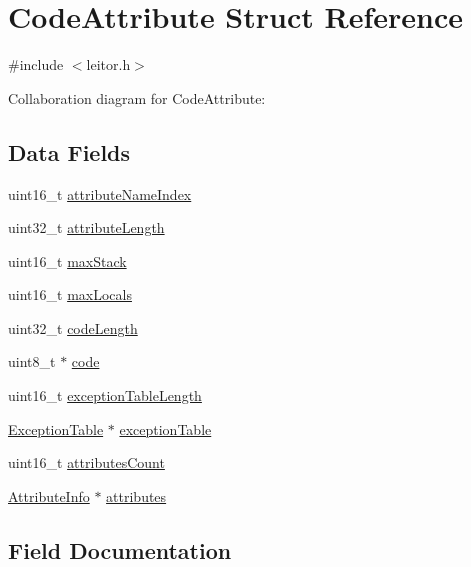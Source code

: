 \hypertarget{structCodeAttribute}{}\section{Code\+Attribute Struct Reference}
\label{structCodeAttribute}


{\ttfamily \#include $<$leitor.\+h$>$}



Collaboration diagram for Code\+Attribute\+:
\subsection*{Data Fields}
\begin{DoxyCompactItemize}
\item 
uint16\+\_\+t \hyperlink{structCodeAttribute_ad7ee24e03606191ad3f75e919e10d314}{attribute\+Name\+Index}
\item 
uint32\+\_\+t \hyperlink{structCodeAttribute_ad7847fdf04ce98313bf197308db2f3eb}{attribute\+Length}
\item 
uint16\+\_\+t \hyperlink{structCodeAttribute_a909f0678f0621617233e76073a55976a}{max\+Stack}
\item 
uint16\+\_\+t \hyperlink{structCodeAttribute_a8fe52af0bc8aa61d0dbeb8a3a9233731}{max\+Locals}
\item 
uint32\+\_\+t \hyperlink{structCodeAttribute_a56ef08dd29653bdfd922f59dbf3ca619}{code\+Length}
\item 
uint8\+\_\+t $\ast$ \hyperlink{structCodeAttribute_a95d8e9c3e0b93220defcbc9852ec6c27}{code}
\item 
uint16\+\_\+t \hyperlink{structCodeAttribute_adcab31464c6fcea300f5fd171c536591}{exception\+Table\+Length}
\item 
\hyperlink{structExceptionTable}{Exception\+Table} $\ast$ \hyperlink{structCodeAttribute_a59ef2cc9a1890d0fd0436278ef14c87a}{exception\+Table}
\item 
uint16\+\_\+t \hyperlink{structCodeAttribute_ae76ef93751db55059ac434e073178f83}{attributes\+Count}
\item 
\hyperlink{structAttributeInfo}{Attribute\+Info} $\ast$ \hyperlink{structCodeAttribute_a99297a4945c876dd5615d84986043c21}{attributes}
\end{DoxyCompactItemize}


\subsection{Field Documentation}
\mbox{\label{structCodeAttribute_ad7847fdf04ce98313bf197308db2f3eb}} 
